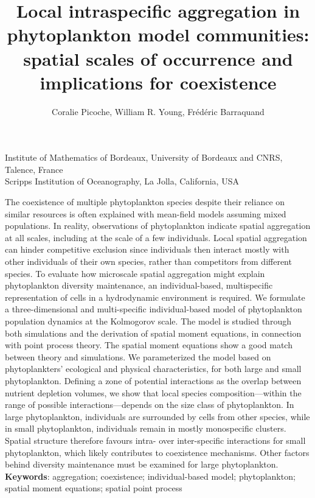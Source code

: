 \documentclass[english]{article}
\date{}
\newcommand{\lyxaddress}[1]{
	\par {\raggedright #1
	\vspace{1.4em}
	\noindent\par}
}
\renewenvironment{abstract}
 {\small
  \begin{center}
  \bfseries \abstractname\vspace{-.5em}\vspace{0pt}
  \end{center}
  \list{}{
    \setlength{\leftmargin}{.5cm}%
    \setlength{\rightmargin}{\leftmargin}%
  }%
  \item\relax}
 {\endlist}
\begin{document}
\title{Local intraspecific aggregation in phytoplankton model communities:
spatial scales of occurrence and implications for coexistence}
\author{Coralie Picoche\textonesuperior , William R. Young\texttwosuperior ,
Fr\'e{}d\'e{}ric Barraquand\textonesuperior{}}
\maketitle

\lyxaddress{\noindent \begin{center}
\textonesuperior Institute of Mathematics of Bordeaux, University
of Bordeaux and CNRS, Talence, France\\
\texttwosuperior Scripps Institution of Oceanography, La Jolla, California,
USA
\par\end{center}}

\vspace{-1cm}
\begin{abstract}
The coexistence of multiple phytoplankton species despite their reliance
on similar resources is often explained with mean-field models assuming
mixed populations. In reality, observations of phytoplankton indicate
spatial aggregation at all scales, including at the scale of a few
individuals. Local spatial aggregation can hinder competitive exclusion
since individuals then interact mostly with other individuals of their
own species, rather than competitors from different species. To evaluate
how microscale spatial aggregation might explain phytoplankton diversity
maintenance, an individual-based, multispecific representation of
cells in a hydrodynamic environment is required. We formulate a three-dimensional
and multi-specific individual-based model of phytoplankton population
dynamics at the Kolmogorov scale. The model is studied through both
simulations and the derivation of spatial moment equations, in connection
with point process theory. The spatial moment equations show a good
match between theory and simulations. We parameterized the model based
on phytoplankters\textquoteright{} ecological and physical characteristics,
for both large and small phytoplankton. Defining a zone of potential
interactions as the overlap between nutrient depletion volumes, we
show that local species composition---within the range of possible
interactions---depends on the size class of phytoplankton. In large
phytoplankton, individuals are surrounded by cells from other species,
while in small phytoplankton, individuals remain in mostly monospecific
clusters. Spatial structure therefore favours intra- over inter-specific
interactions for small phytoplankton, which likely contributes to
coexistence mechanisms. Other factors behind diversity maintenance
must be examined for large phytoplankton. 
\end{abstract}
\textbf{Keywords}: aggregation; coexistence; individual-based model;
phytoplankton; spatial moment equations; spatial point process 
\end{document}
